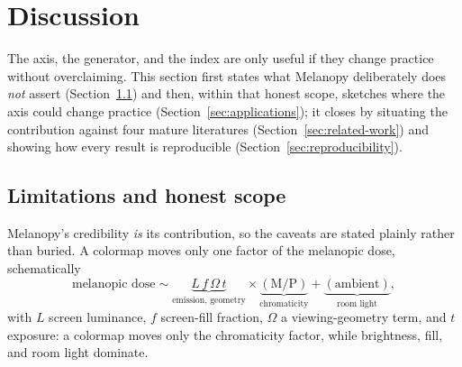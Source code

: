 \documentclass[10pt,a4paper,twocolumn]{article}
\begin{document}
\section{Discussion}\label{sec:discussion}

The axis, the generator, and the index are only useful if they change practice without overclaiming.
This section first states what Melanopy deliberately does \emph{not} assert (Section~\ref{sec:limitations}) and then, within that honest scope, sketches where the axis could change practice (Section~\ref{sec:applications}); it closes by situating the contribution against four mature literatures (Section~\ref{sec:related-work}) and showing how every result is reproducible (Section~\ref{sec:reproducibility}).

\subsection{Limitations and honest scope}\label{sec:limitations}

Melanopy's credibility \emph{is} its contribution, so the caveats are stated plainly rather than buried.
A colormap moves only one factor of the melanopic dose, schematically
\begin{equation}
  \text{melanopic dose} \sim
  \underbrace{L\,f\,\Omega\,t}_{\text{emission, geometry}} \times
  \underbrace{(\mathrm{M/P})}_{\text{chromaticity}} +
  \underbrace{(\text{ambient})}_{\text{room light}},
  \label{eq:dose}
\end{equation}
with $L$ screen luminance, $f$ screen-fill fraction, $\Omega$ a viewing-geometry term, and $t$ exposure: a colormap moves only the chromaticity factor, while brightness, fill, and room light dominate.
\end{document}

